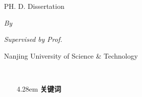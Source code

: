 {\begin{titlepage}
\begin{center}
    \parbox[t][1cm][b]{\textwidth}{\xiaoer
    \begin{center} {PH. D. Dissertation}\end{center} }

    \parbox[t][2mm][t]{\textwidth}{
    \begin{center}  \end{center}}

    \parbox[t][3.0cm][b]{\textwidth}{\erhao
    \begin{center} {\textbf{\@etitle}}\end{center} }

    \parbox[t][3.0cm][t]{\textwidth}{
    \begin{center}  \end{center}}

    \parbox[t][2.5mm][b]{\textwidth}{\xiaoer
    \begin{center} { \emph{By}}\end{center}

    \begin{center} { \emph{\textbf{\@eauthor}}}\end{center}}

    \parbox[t][1.2cm][b]{\textwidth}{\xiaoer
    \begin{center} {\emph{Supervised by Prof.~\textbf{\@esupervisor}}}\end{center}}

    \parbox[t][6.0cm][t]{\textwidth}{
    \begin{center}  \end{center} }

    \parbox[t][2.6cm][b]{\textwidth}{\xiaoer
    \begin{center} {Nanjing University of  Science \& Technology}\end{center}

    \begin{center} {\@edate }\end{center}}

   \end{center}
  \end{titlepage}
  \ifoneortwoside
    \newpage
    ~~~\vspace{1em}
    \thispagestyle{empty}
  \fi

 \thispagestyle{empty}

 \ifoneortwoside
    \newpage
    ~~~\vspace{1em}
    \thispagestyle{empty}
  \fi
\clearpage {} %
\setcounter{page}{1}
\song \normalsize
{}
\@cabstract \vspace{1em} \hangindent4.28em\noindent
{\sihao\song \textbf{关键词}} \quad \@ckeywords

}
